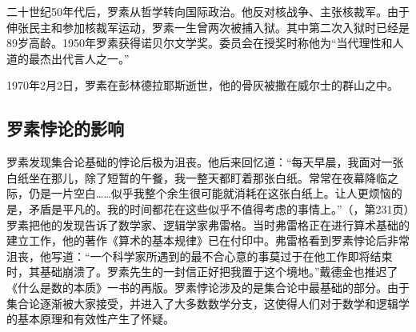 \documentclass[b5paper]{ctexart}
\begin{document}
二十世纪50年代后，罗素从哲学转向国际政治。他反对核战争、主张核裁军。由于伸张民主和参加核裁军运动，罗素一生曾两次被捕入狱。其中第二次入狱时已经是89岁高龄。1950年罗素获得诺贝尔文学奖。委员会在授奖时称他为“当代理性和人道的最杰出代言人之一。”

1970年2月2日，罗素在彭林德拉耶斯逝世，他的骨灰被撒在威尔士的群山之中。

\subsection{罗素悖论的影响}

罗素发现集合论基础的悖论后极为沮丧。他后来回忆道：“每天早晨，我面对一张白纸坐在那儿，除了短暂的午餐，我一整天都盯着那张白纸。常常在夜幕降临之际，仍是一片空白……似乎我整个余生很可能就消耗在这张白纸上。让人更烦恼的是，矛盾是平凡的。我的时间都花在这些似乎不值得考虑的事情上。”（\cite{HanXueTao16}，第231页）罗素把他的发现告诉了数学家、逻辑学家弗雷格。当时弗雷格正在进行算术基础的建立工作，他的著作《算术的基本规律》已在付印中。弗雷格看到罗素悖论后非常沮丧，他写道：“一个科学家所遇到的最不合心意的事莫过于在他工作即将结束时，其基础崩溃了。罗素先生的一封信正好把我置于这个境地。”戴德金也推迟了《什么是数的本质》一书的再版。罗素悖论涉及的是集合论中最基础的部分。由于集合论逐渐被大家接受，并进入了大多数数学分支，这使得人们对于数学和逻辑学的基本原理和有效性产生了怀疑。

\begin{Exercise}\label{ex:Russell-paradox}
\end{Exercise}

\begin{Answer}[ref = {ex:Russell-paradox}]
\end{Answer}
\end{document}
